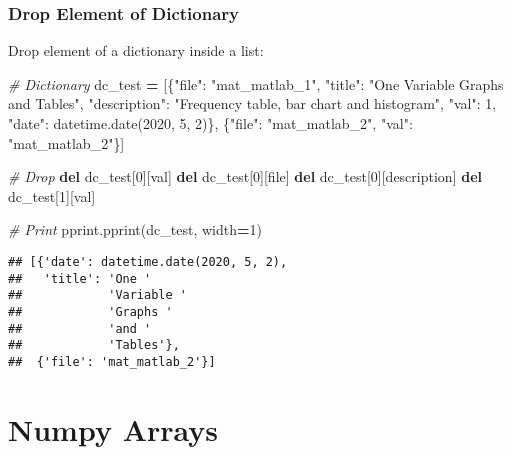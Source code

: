 \documentclass[
]{book}
\newenvironment{Shaded}{\begin{snugshade}}{\end{snugshade}}
\newcommand{\CommentTok}[1]{\textcolor[rgb]{0.56,0.35,0.01}{\textit{#1}}}
\newcommand{\DecValTok}[1]{\textcolor[rgb]{0.00,0.00,0.81}{#1}}
\newcommand{\KeywordTok}[1]{\textcolor[rgb]{0.13,0.29,0.53}{\textbf{#1}}}
\newcommand{\NormalTok}[1]{#1}
\newcommand{\OperatorTok}[1]{\textcolor[rgb]{0.81,0.36,0.00}{\textbf{#1}}}
\newcommand{\StringTok}[1]{\textcolor[rgb]{0.31,0.60,0.02}{#1}}
\begin{document}
\hypertarget{drop-element-of-dictionary}{%
\subsubsection{Drop Element of Dictionary}\label{drop-element-of-dictionary}}

Drop element of a dictionary inside a list:

\begin{Shaded}
\begin{Highlighting}[]
\CommentTok{\# Dictionary}
\NormalTok{dc\_test }\OperatorTok{=}\NormalTok{ [\{}\StringTok{"file"}\NormalTok{: }\StringTok{"mat\_matlab\_1"}\NormalTok{,}
           \StringTok{"title"}\NormalTok{: }\StringTok{"One Variable Graphs and Tables"}\NormalTok{,}
           \StringTok{"description"}\NormalTok{: }\StringTok{"Frequency table, bar chart and histogram"}\NormalTok{,}
           \StringTok{"val"}\NormalTok{: }\DecValTok{1}\NormalTok{,}
           \StringTok{"date"}\NormalTok{: datetime.date(}\DecValTok{2020}\NormalTok{, }\DecValTok{5}\NormalTok{, }\DecValTok{2}\NormalTok{)\},}
\NormalTok{           \{}\StringTok{"file"}\NormalTok{: }\StringTok{"mat\_matlab\_2"}\NormalTok{, }
            \StringTok{"val"}\NormalTok{: }\StringTok{"mat\_matlab\_2"}\NormalTok{\}]}

\CommentTok{\# Drop           }
\KeywordTok{del}\NormalTok{ dc\_test[}\DecValTok{0}\NormalTok{][}\StringTok{\textquotesingle{}val\textquotesingle{}}\NormalTok{]}
\KeywordTok{del}\NormalTok{ dc\_test[}\DecValTok{0}\NormalTok{][}\StringTok{\textquotesingle{}file\textquotesingle{}}\NormalTok{]}
\KeywordTok{del}\NormalTok{ dc\_test[}\DecValTok{0}\NormalTok{][}\StringTok{\textquotesingle{}description\textquotesingle{}}\NormalTok{]}
\KeywordTok{del}\NormalTok{ dc\_test[}\DecValTok{1}\NormalTok{][}\StringTok{\textquotesingle{}val\textquotesingle{}}\NormalTok{]}

\CommentTok{\# Print}
\NormalTok{pprint.pprint(dc\_test, width}\OperatorTok{=}\DecValTok{1}\NormalTok{)}
\end{Highlighting}
\end{Shaded}

\begin{verbatim}
## [{'date': datetime.date(2020, 5, 2),
##   'title': 'One '
##            'Variable '
##            'Graphs '
##            'and '
##            'Tables'},
##  {'file': 'mat_matlab_2'}]
\end{verbatim}

\hypertarget{numpy-arrays}{%
\section{Numpy Arrays}\label{numpy-arrays}}
\end{document}
